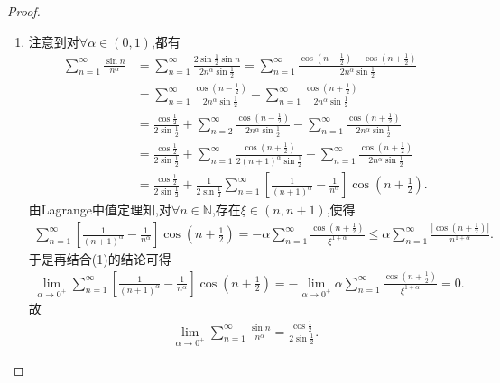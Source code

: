 \documentclass[../../main.tex]{subfiles}%
\begin{document}
\begin{proof}
\begin{enumerate}[(1)]
\item 注意到对$\forall \alpha \in \left( 0,1 \right)$,都有
\begin{align*}
\sum\limits_{n=1}^{\infty} \frac{\sin n}{n^{\alpha}}&=\sum\limits_{n=1}^{\infty} \frac{2\sin \frac{1}{2}\sin n}{2n^{\alpha}\sin \frac{1}{2}}=\sum\limits_{n=1}^{\infty} \frac{\cos \left( n-\frac{1}{2} \right) -\cos \left( n+\frac{1}{2} \right)}{2n^{\alpha}\sin \frac{1}{2}}\\
&=\sum\limits_{n=1}^{\infty} \frac{\cos \left( n-\frac{1}{2} \right)}{2n^{\alpha}\sin \frac{1}{2}}-\sum\limits_{n=1}^{\infty} \frac{\cos \left( n+\frac{1}{2} \right)}{2n^{\alpha}\sin \frac{1}{2}}\\
&=\frac{\cos \frac{1}{2}}{2\sin \frac{1}{2}}+\sum\limits_{n=2}^{\infty} \frac{\cos \left( n-\frac{1}{2} \right)}{2n^{\alpha}\sin \frac{1}{2}}-\sum\limits_{n=1}^{\infty} \frac{\cos \left( n+\frac{1}{2} \right)}{2n^{\alpha}\sin \frac{1}{2}}\\
&=\frac{\cos \frac{1}{2}}{2\sin \frac{1}{2}}+\sum\limits_{n=1}^{\infty} \frac{\cos \left( n+\frac{1}{2} \right)}{2\left( n+1 \right) ^{\alpha}\sin \frac{1}{2}}-\sum\limits_{n=1}^{\infty} \frac{\cos \left( n+\frac{1}{2} \right)}{2n^{\alpha}\sin \frac{1}{2}}\\
&=\frac{\cos \frac{1}{2}}{2\sin \frac{1}{2}}+\frac{1}{2\sin \frac{1}{2}}\sum\limits_{n=1}^{\infty} \left[ \frac{1}{\left( n+1 \right) ^{\alpha}}-\frac{1}{n^{\alpha}} \right] \cos \left( n+\frac{1}{2} \right).
\end{align*}
由Lagrange中值定理知,对$\forall n\in \mathbb{N}$,存在$\xi \in \left( n,n+1 \right)$,使得
\begin{align*}
\sum\limits_{n=1}^{\infty} \left[ \frac{1}{\left( n+1 \right) ^{\alpha}}-\frac{1}{n^{\alpha}} \right] \cos \left( n+\frac{1}{2} \right)=-\alpha \sum\limits_{n=1}^{\infty} \frac{\cos \left( n+\frac{1}{2} \right)}{\xi ^{1+\alpha}} \leqslant \alpha \sum\limits_{n=1}^{\infty} \frac{|\cos \left( n+\frac{1}{2} \right)|}{n^{1+\alpha}}.
\end{align*}
于是再结合(1)的结论可得
\begin{align*}
\lim_{\alpha \rightarrow 0^+} \sum\limits_{n=1}^{\infty} \left[ \frac{1}{\left( n+1 \right) ^{\alpha}}-\frac{1}{n^{\alpha}} \right] \cos \left( n+\frac{1}{2} \right)=-\lim_{\alpha \rightarrow 0^+} \alpha \sum\limits_{n=1}^{\infty} \frac{\cos \left( n+\frac{1}{2} \right)}{\xi ^{1+\alpha}}=0.
\end{align*}
故
\begin{align*}
\lim_{\alpha \rightarrow 0^+} \sum\limits_{n=1}^{\infty} \frac{\sin n}{n^{\alpha}}=\frac{\cos \frac{1}{2}}{2\sin \frac{1}{2}}.
\end{align*}
\end{enumerate}

\end{proof}
\end{document}
